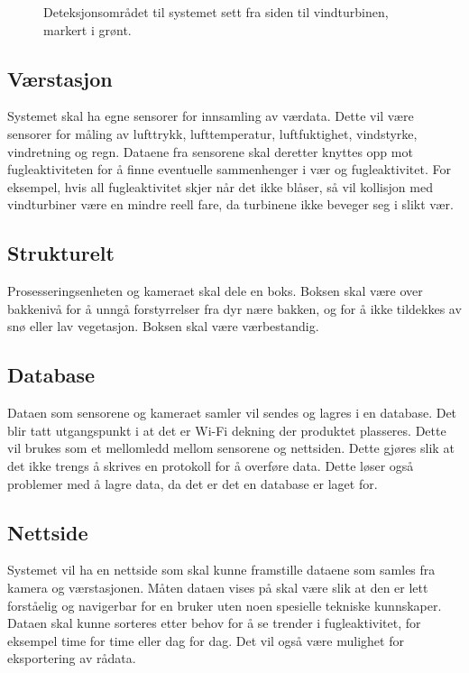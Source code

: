 \begin{figure}[H]
\begin{minipage}[b]{0.45\textwidth}
    \caption{Deteksjonsområdet til systemet sett fra siden til vindturbinen, markert i grønt.}
    \label{fig:TurbinSiden}
  \end{minipage}
\end{figure}



\subsection{Værstasjon}
Systemet skal ha egne sensorer for innsamling av værdata. Dette vil være sensorer for måling av lufttrykk, lufttemperatur, luftfuktighet, vindstyrke, vindretning og regn. Dataene fra sensorene skal deretter knyttes opp mot fugleaktiviteten for å finne eventuelle sammenhenger i vær og fugleaktivitet. For eksempel, hvis all fugleaktivitet skjer når det ikke blåser, så vil kollisjon med vindturbiner være en mindre reell fare, da turbinene ikke beveger seg i slikt vær. 

\subsection{Strukturelt}

Prosesseringsenheten og kameraet skal dele en boks. Boksen skal være over bakkenivå for å unngå forstyrrelser fra dyr nære bakken, og for å ikke tildekkes av snø eller lav vegetasjon. Boksen skal være værbestandig. 

\subsection{Database}

Dataen som sensorene og kameraet samler vil sendes og lagres i en database. Det blir tatt utgangspunkt i at det er Wi-Fi dekning der produktet plasseres. Dette vil brukes som et mellomledd mellom sensorene og nettsiden. Dette gjøres slik at det ikke trengs å skrives en protokoll for å overføre data. Dette løser også problemer med å lagre data, da det er det en database er laget for. 


\subsection{Nettside}

Systemet vil ha en nettside som skal kunne framstille dataene som samles fra kamera og værstasjonen. Måten dataen vises på skal være slik at den er lett forståelig og navigerbar for en bruker uten noen spesielle tekniske kunnskaper. Dataen skal kunne sorteres etter behov for å se trender i fugleaktivitet, for eksempel time for time eller dag for dag. Det vil også være mulighet for eksportering av rådata. 

